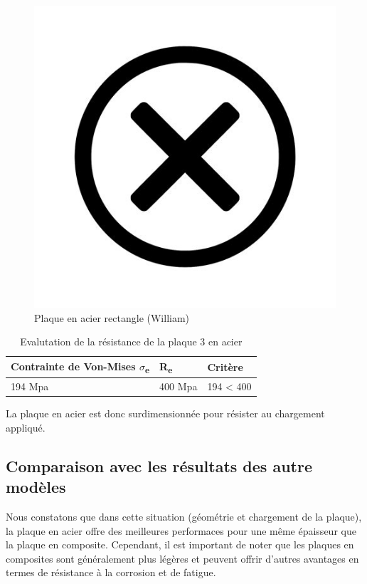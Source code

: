 \documentclass[a4paper,12pt]{article}
\begin{document}
\begin{figure}[H]
\begin{minipage}{0.495\textwidth}
		\includegraphics[width=\textwidth]{media/no-image.jpg} %
		\caption{Plaque en acier rectangle (William)}
		\label{fig:image2}
	\end{minipage}
\end{figure}

\begin{table}[H]
	\centering
	\begin{tabular}{|l|l|l|}
	\hline
	Contrainte de Von-Mises $\sigma$\textsubscript{e} & R\textsubscript{e}       & Critère \\ \hline
			194 Mpa				& 400 Mpa &     194 < 400    \\ \hline
	\end{tabular}
	\caption{Evalutation de la résistance de la plaque 3 en acier}
	\label{tab:Evalutation de la résistance de la plaque 3 en acier}
	\end{table}
La plaque en acier est donc surdimensionnée pour résister au chargement appliqué.

\subsection{Comparaison avec les résultats des autre modèles}
Nous constatons que dans cette situation (géométrie et chargement de la plaque), la plaque en acier offre des meilleures performaces pour une même épaisseur que la plaque en composite. Cependant, il est important de noter que les plaques en composites sont généralement plus légères et peuvent offrir d'autres avantages en termes de résistance à la corrosion et de fatigue.
\end{document}

